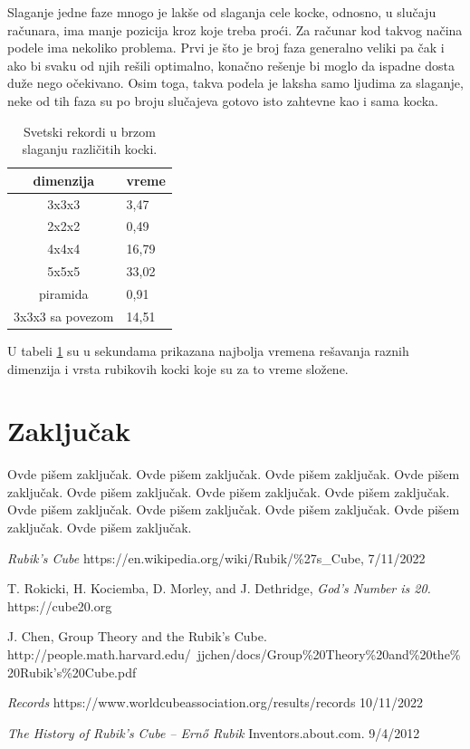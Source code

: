 \documentclass[a4paper]{article}
\begin{document}
Slaganje jedne faze mnogo je lakše od slaganja cele kocke, odnosno, u slučaju računara, ima manje pozicija kroz koje treba proći. 
    Za računar kod takvog načina podele ima nekoliko problema.
    Prvi je što je broj faza generalno veliki pa čak i ako bi svaku od njih rešili optimalno, konačno rešenje bi moglo da ispadne dosta duže nego očekivano.
    Osim toga, takva podela je laksha samo ljudima za slaganje, neke od tih faza su po broju slučajeva gotovo isto zahtevne kao i sama kocka.

\begin{table}[h!]
\begin{center}
\caption{Svetski rekordi u brzom slaganju različitih kocki.}
\begin{tabular}{|c|l|} \hline
dimenzija& vreme\\ \hline
3x3x3 &3,47\\ \hline
2x2x2 &0,49\\ \hline
4x4x4 &16,79\\ \hline
5x5x5 &33,02\\ \hline
piramida &0,91\\ \hline
3x3x3 sa povezom &14,51\\ \hline
\end{tabular}
\label{tab:tabela1}
\end{center}
\end{table}

U tabeli \ref{tab:tabela1} su u sekundama prikazana najbolja vremena rešavanja raznih dimenzija i vrsta rubikovih kocki koje su za to vreme složene.

\section{Zaključak}
\label{sec:zakljucak}

Ovde pišem zaključak. 
Ovde pišem zaključak. 
Ovde pišem zaključak. 
Ovde pišem zaključak. 
Ovde pišem zaključak. 
Ovde pišem zaključak. 
Ovde pišem zaključak. 
Ovde pišem zaključak. 
Ovde pišem zaključak. 
Ovde pišem zaključak. 
Ovde pišem zaključak. 
Ovde pišem zaključak. 


\appendix

\begin{thebibliography}{9}

 \emph{Rubik's Cube} https://en.wikipedia.org/wiki/Rubik/\%27s\_Cube, 7/11/2022

 T. Rokicki, H. Kociemba, D. Morley, and J. Dethridge, \emph{God’s Number is 20.} https://cube20.org

 J. Chen, Group Theory and the Rubik’s Cube. http://people.math.harvard.edu/~jjchen/docs/Group\%20Theory\%20and\%20the\%20Rubik’s\%20Cube.pdf

 \emph{Records} https://www.worldcubeassociation.org/results/records 10/11/2022

\bibitem{} \emph{The History of Rubik's Cube – Ernő Rubik} Inventors.about.com. 9/4/2012

\end{thebibliography}

\appendix
\end{document}

